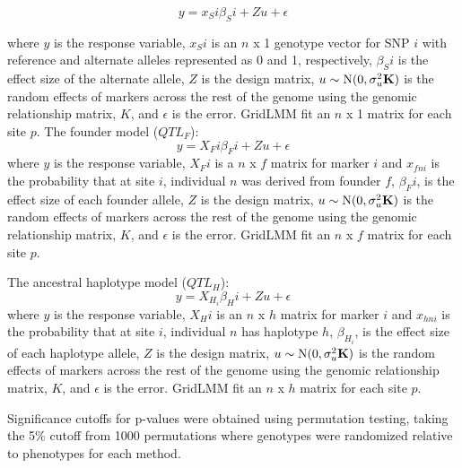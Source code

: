 \documentclass[article,9pt,twocolumn,twoside]{rilabRxiv}
\begin{document}
\begin{equation}
\label{eqn:gridlmm1}
 y = x_Si{\beta_Si} + Zu + \epsilon
\end{equation}

where $y$ is the response variable, $x_Si$ is an $n$ x 1 genotype vector for SNP $i$ with reference and alternate alleles represented as 0 and 1, respectively, $\beta_Si$ is the effect size of the alternate allele, $Z$ is the design matrix, $u \sim \mbox{N}(0,\sigma^2_u \bf{K})$ is the random effects of markers across the rest of the genome using the genomic relationship matrix, $K$, and $\epsilon$ is the error.
GridLMM fit an $n$ x 1 matrix for each site $p$.
The founder model ($QTL_F$):
\begin{equation}
\label{eqn:gridlmm2}
 y = X_Fi{\beta_Fi} + Zu + \epsilon
\end{equation}
where $y$ is the response variable, $X_Fi$ is a $n$ x $f$ matrix for marker $i$ and $x_{fni}$ is the probability that at site $i$, individual $n$ was derived from founder $f$, $\beta_Fi$, is the effect size of each founder allele, $Z$ is the design matrix, $u \sim \mbox{N}(0,\sigma^2_u \bf{K})$ is the random effects of markers across the rest of the genome using the genomic relationship matrix, $K$, and $\epsilon$ is the error. GridLMM fit an $n$ x $f$ matrix for each site $p$.

The ancestral haplotype model ($QTL_H$):
\begin{equation}
\label{eqn:gridlmm3}
 y = X_H_i{\beta_Hi} + Zu + \epsilon
\end{equation}
where $y$ is the response variable, $X_Hi$ is an $n$ x $h$ matrix for marker $i$ and $x_{hni}$ is the probability that at site $i$, individual $n$ has haplotype $h$, $\beta_H_i$, is the effect size of each haplotype allele, $Z$ is the design matrix, $u \sim \mbox{N}(0,\sigma^2_u \bf{K})$ is the random effects of markers across the rest of the genome using the genomic relationship matrix, $K$, and $\epsilon$ is the error. GridLMM fit an $n$ x $h$ matrix for each site $p$.

 Significance cutoffs for p-values were obtained using permutation testing, taking the 5\% cutoff from 1000 permutations where genotypes were randomized relative to phenotypes for each method.
\end{document}
